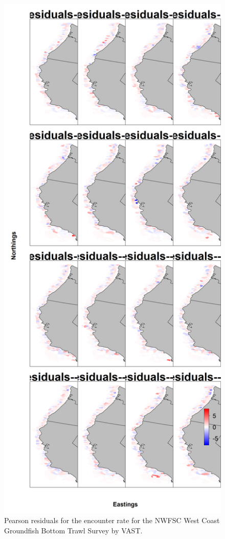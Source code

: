 \documentclass[12pt,]{article}
\begin{document}
\begin{figure}
\centering
\includegraphics{Figures/nwfsc_maps--encounter_pearson_resid.png}
\caption{Pearson residuals for the encounter rate for the NWFSC West
Coast Groundfish Bottom Trawl Survey by VAST. \label{fig:nw_enc_rate}}
\end{figure}
\end{document}

